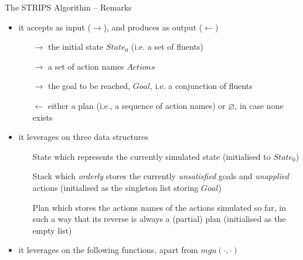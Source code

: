 \documentclass[presentation]{beamer}\mode<presentation>{\usetheme{AMSBolognaFC}}
\begin{document}
\begin{frame}[c,allowframebreaks]{The STRIPS Algorithm -- Remarks}
%
 \begin{itemize}
     \item it accepts as input ($\rightarrow$), and produces as output ($\leftarrow$)
    \begin{itemize}
        \item[$\rightarrow$] the initial state $State_0$ (i.e. a set of fluents)
        \item[$\rightarrow$] a set of action \alert{names} $Actions$
        \item[$\rightarrow$] the goal to be reached, $Goal$, i.e. a \alert{conjunction} of fluents
        \item[$\leftarrow$] either a plan (i.e., a \alert{sequence} of action names) or $\varnothing$, in case none exists
    \end{itemize}
    \item it leverages on three data structures
    \begin{itemize}
        \item[State] which represents the currently simulated state (initialised to $State_0$)
        \item[Stack] which \emph{orderly} stores the currently \emph{unsatisfied} goals and \emph{unapplied} actions (initialised as the singleton list storing $Goal$)
        \item[Plan] which stores the actions names of the actions simulated so far, in such a way that its reverse is always a (partial) plan (initialised as the empty list)
    \end{itemize}
\end{itemize}
%
\framebreak
%
\begin{itemize}
    \item it leverages on the following functions, apart from $mgu(\cdot,\cdot)$
\end{itemize}
\end{frame}
\end{document}
